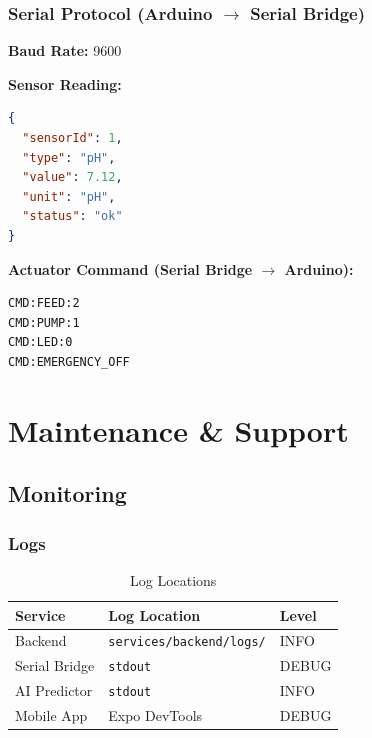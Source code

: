 \documentclass[12pt,a4paper,oneside]{article}
\begin{document}
\subsubsection{Serial Protocol (Arduino $\rightarrow$ Serial Bridge)}
\textbf{Baud Rate:} 9600

\textbf{Sensor Reading:}
\begin{lstlisting}[language=JSON]
{
  "sensorId": 1,
  "type": "pH",
  "value": 7.12,
  "unit": "pH",
  "status": "ok"
}
\end{lstlisting}

\textbf{Actuator Command (Serial Bridge $\rightarrow$ Arduino):}
\begin{lstlisting}[language=bash]
CMD:FEED:2
CMD:PUMP:1
CMD:LED:0
CMD:EMERGENCY_OFF
\end{lstlisting}

\newpage
\section{Maintenance \& Support}

\subsection{Monitoring}

\subsubsection{Logs}
\begin{table}[H]
    \centering
    \begin{tabularx}{\textwidth}{lll}
        \toprule
        \textbf{Service} & \textbf{Log Location} & \textbf{Level} \\
        \midrule
        Backend & \texttt{services/backend/logs/} & INFO \\
        Serial Bridge & \texttt{stdout} & DEBUG \\
        AI Predictor & \texttt{stdout} & INFO \\
        Mobile App & Expo DevTools & DEBUG \\
        \bottomrule
    \end{tabularx}
    \caption{Log Locations}
\end{table}
\end{document}
